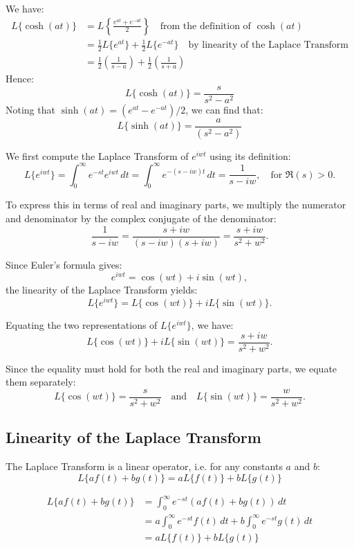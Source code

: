 \documentclass[a4paper, 10pt]{article}
\begin{document}
\begin{examplebox}[Find the Laplace Transform of $f(t) = \cosh(at)$]
  We have:
  \begin{align*}
    L\{\cosh(at)\} & = L\left\{ \frac{e^{at} + e^{-at}}{2}\right\} \quad \text{from the definition of }\cosh(at)           \\
                   & = \frac{1}{2}L\{e^{at}\} + \frac{1}{2}L\{e^{-at}\} \quad \text{by linearity of the Laplace Transform} \\
                   & = \frac{1}{2}\left(\frac{1}{s-a}\right) + \frac{1}{2}\left(\frac{1}{s+a}\right)
  \end{align*}
  Hence:
  $$L\{\cosh(at)\} = \frac{s}{s^2 - a^2}$$
  Noting that $\sinh(at) = (e^{at} - e^{-at})/2$, we can find that:
  $$L\{\sinh(at)\} = \frac{a}{(s^2 - a^2)}$$
\end{examplebox}

\begin{examplebox}
  We first compute the Laplace Transform of $e^{iwt}$ using its definition:
  \[
    L\{e^{iwt}\} = \int_0^\infty e^{-st}e^{iwt}\,dt
    = \int_0^\infty e^{-(s-iw)t}\,dt
    = \frac{1}{s-iw}, \quad \text{for } \Re(s) > 0.
  \]

  To express this in terms of real and imaginary parts, we multiply the numerator and denominator by the complex conjugate of the denominator:
  \[
    \frac{1}{s-iw} = \frac{s+iw}{(s-iw)(s+iw)} = \frac{s+iw}{s^2 + w^2}.
  \]

  Since Euler's formula gives:
  \[
    e^{iwt} = \cos(wt) + i\sin(wt),
  \]
  the linearity of the Laplace Transform yields:
  \[
    L\{e^{iwt}\} = L\{\cos(wt)\} + iL\{\sin(wt)\}.
  \]

  Equating the two representations of $L\{e^{iwt}\}$, we have:
  \[
    L\{\cos(wt)\} + iL\{\sin(wt)\} = \frac{s+iw}{s^2+w^2}.
  \]

  Since the equality must hold for both the real and imaginary parts, we equate them separately:
  \[
    L\{\cos(wt)\} = \frac{s}{s^2+w^2} \quad \text{and} \quad L\{\sin(wt)\} = \frac{w}{s^2+w^2}.
  \]
\end{examplebox}
\pagebreak
\subsection{Linearity of the Laplace Transform}
The Laplace Transform is a linear operator, i.e. for any constants $a$ and $b$:
$$L\{af(t) + bg(t)\} = aL\{f(t)\} + bL\{g(t)\}$$
\begin{proofbox}
  \begin{align*}
    L\{af(t) + bg(t)\}
     & = \int_0^\infty e^{-st}(af(t) + bg(t))\, dt                         \\
     & = a\int_0^\infty e^{-st}f(t)\, dt + b\int_0^\infty e^{-st}g(t)\, dt \\
     & = aL\{f(t)\} + bL\{g(t)\}
  \end{align*}
\end{proofbox}
\end{document}
